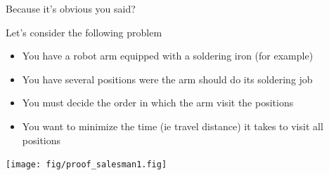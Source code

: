 \begin{frame}{Because it's obvious you said?}
  \begin{block}{Let's consider the following problem}
    \begin{itemize}
    \item You have a robot arm equipped with a soldering iron (for example)
    \item You have several positions were the arm should do its soldering job
    \item You must decide the order in which the arm visit the positions
    \item You want to minimize the time (ie travel distance) it takes to visit
      all positions
    \end{itemize}
  \end{block}

  \centerline{\texttt{[image: fig/proof\_salesman1.fig]}}
\end{frame}
